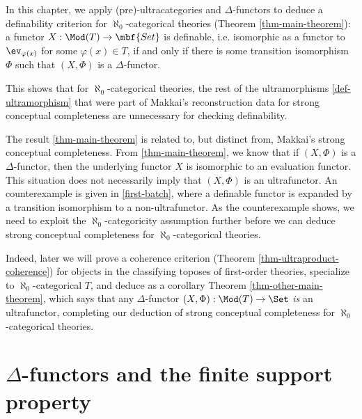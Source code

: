 
In this chapter, we apply (pre)-ultracategories and $\Delta$-functors to deduce a definability criterion for $\aleph_0$-categorical theories (Theorem \ref{thm-main-theorem}): a functor $X : \Mod(T) \to \mbf{Set}$ is definable, i.e. isomorphic as a functor to $\ev_{\varphi(x)}$ for some $\varphi(x) \in T$, if and only if there is some transition isomorphism $\Phi$ such that $(X, \Phi)$ is a $\Delta$-functor.

This shows that for $\aleph_0$-categorical theories, the rest of the ultramorphisms \ref{def-ultramorphism} that were part of Makkai's reconstruction data for strong conceptual completeness are unnecessary for checking definability.

The result \ref{thm-main-theorem} is related to, but distinct from, Makkai's strong conceptual completeness. From \ref{thm-main-theorem}, we know that if $(X, \Phi)$ is a $\Delta$-functor, then the underlying functor $X$ is isomorphic to an evaluation functor. This situation does not necessarily imply that $(X, \Phi)$ is an ultrafunctor. An counterexample is given in \ref{first-batch}, where a definable functor is expanded by a transition isomorphism to a non-ultrafunctor. As the counterexample shows, we need to exploit the $\aleph_0$-categoricity assumption further before we can deduce strong conceptual completeness for $\aleph_0$-categorical theories.

Indeed, later we will prove a coherence criterion (Theorem \ref{thm-ultraproduct-coherence}) for objects in the classifying toposes of first-order theories, specialize to $\aleph_0$-categorical $T$, and deduce as a corollary Theorem \ref{thm-other-main-theorem}, which says that any $\Delta$-functor $(X, \Phi) : \Mod(T) \to \Set$ \emph{is} an ultrafunctor, completing our deduction of strong conceptual completeness for $\aleph_0$-categorical theories.

\section{$\Delta$-functors and the finite support property}

